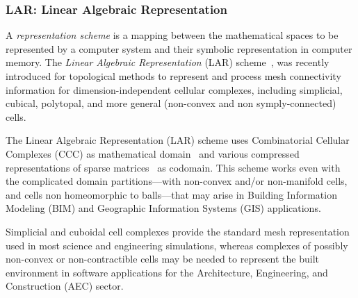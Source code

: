 \documentclass[]{egpubl}
\begin{document}
\subsubsection*{LAR: Linear Algebraic Representation} 

A \emph{representation scheme} is a mapping between the mathematical spaces to be represented by a computer system and their symbolic representation in computer memory. 
The \emph{Linear Algebraic Representation} (LAR) scheme~\cite{Dicarlo:2014:TNL:2543138.2543294}, was recently introduced for topological methods to represent and process mesh connectivity information for dimension-independent cellular complexes, including simplicial, cubical, polytopal, and more general (non-convex and non symply-connected) cells. 

The Linear Algebraic Representation (LAR) scheme uses Combinatorial Cellular Complexes (CCC) as mathematical domain~\cite{Basak:2010} and various compressed representations of sparse matrices~\cite{Williams:2007:OSM:1362622.1362674,gemmexp} as codomain.
This scheme works even with the complicated domain partitions---with non-convex and/or non-manifold cells, and cells non homeomorphic to balls---that may arise in Building Information Modeling (BIM) and Geographic Information Systems (GIS) applications. 

Simplicial and cuboidal cell complexes provide the standard mesh representation used in most science and engineering simulations, whereas complexes of possibly non-convex or non-contractible cells may be needed to represent the built environment in software applications for the Architecture, Engineering, and Construction (AEC) sector.
\end{document}
